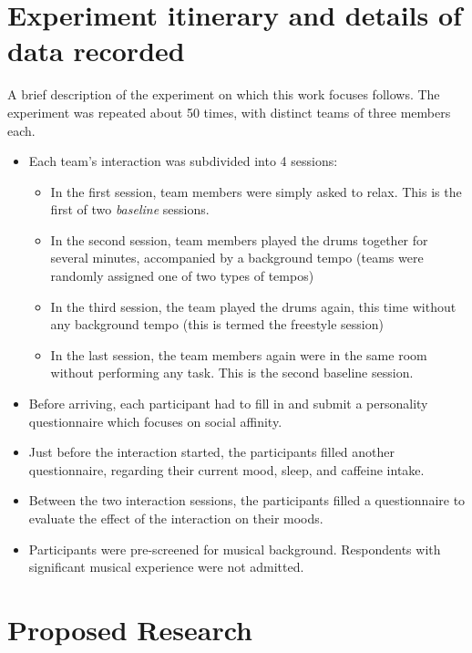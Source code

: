 \documentclass[a4paper, 11pt]{article}      %
\begin{document}
\section{Experiment itinerary and details of data recorded}
A brief description of the experiment on which this work focuses follows. The experiment was repeated about 50 times, with distinct teams of three members each.
\begin{itemize}
    \item Each team's interaction was subdivided into 4 sessions:
    \begin{itemize}
        \item In the first session, team members were simply asked to relax. This is the first of two \emph{baseline} sessions.
        \item In the second session, team members played the drums together for several minutes, accompanied by a background tempo (teams were randomly assigned one of two types of tempos)
        \item In the third session, the team played the drums again, this time without any background tempo (this is termed the freestyle session)
        \item In the last session, the team members again were in the same room without performing any task. This is the second baseline session.
    \end{itemize}
    \item Before arriving, each participant had to fill in and submit a personality questionnaire which focuses on social affinity.
    \item Just before the interaction started, the participants filled another questionnaire, regarding their current mood, sleep, and caffeine intake.
    \item Between the two interaction sessions, the participants filled a questionnaire to evaluate the effect of the interaction on their moods.
    \item Participants were pre-screened for musical  background. Respondents with significant musical experience were not admitted.
\end{itemize}



\section{Proposed Research}
\end{document}

